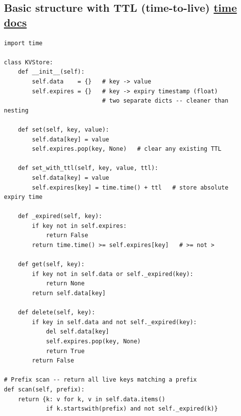 \documentclass[10pt,letterpaper]{article}
\begin{document}
\subsection{Basic structure with TTL (time-to-live) \normalfont\small\href{https://docs.python.org/3/library/time.html}{time docs}}
\begin{lstlisting}
import time

class KVStore:
    def __init__(self):
        self.data    = {}   # key -> value
        self.expires = {}   # key -> expiry timestamp (float)
                            # two separate dicts -- cleaner than nesting

    def set(self, key, value):
        self.data[key] = value
        self.expires.pop(key, None)   # clear any existing TTL

    def set_with_ttl(self, key, value, ttl):
        self.data[key] = value
        self.expires[key] = time.time() + ttl   # store absolute expiry time

    def _expired(self, key):
        if key not in self.expires:
            return False
        return time.time() >= self.expires[key]   # >= not >

    def get(self, key):
        if key not in self.data or self._expired(key):
            return None
        return self.data[key]

    def delete(self, key):
        if key in self.data and not self._expired(key):
            del self.data[key]
            self.expires.pop(key, None)
            return True
        return False

# Prefix scan -- return all live keys matching a prefix
def scan(self, prefix):
    return {k: v for k, v in self.data.items()
            if k.startswith(prefix) and not self._expired(k)}
\end{lstlisting}
\end{document}
